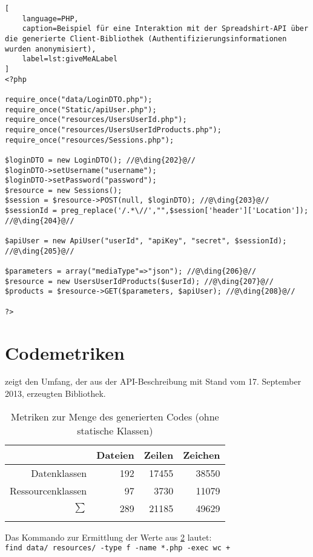 \begin{minipage}{\textwidth}
\begin{lstlisting}[
    language=PHP,
    caption=Beispiel für eine Interaktion mit der Spreadshirt-API über die generierte Client-Bibliothek (Authentifizierungsinformationen wurden anonymisiert),
    label=lst:giveMeALabel
]
<?php

require_once("data/LoginDTO.php");
require_once("Static/apiUser.php");
require_once("resources/UsersUserId.php");
require_once("resources/UsersUserIdProducts.php");
require_once("resources/Sessions.php");

$loginDTO = new LoginDTO(); //@\ding{202}@//
$loginDTO->setUsername("username");
$loginDTO->setPassword("password");
$resource = new Sessions();
$session = $resource->POST(null, $loginDTO); //@\ding{203}@//
$sessionId = preg_replace('/.*\//',"",$session['header']['Location']); //@\ding{204}@//

$apiUser = new ApiUser("userId", "apiKey", "secret", $sessionId); //@\ding{205}@//

$parameters = array("mediaType"=>"json"); //@\ding{206}@//
$resource = new UsersUserIdProducts($userId); //@\ding{207}@//
$products = $resource->GET($parameters, $apiUser); //@\ding{208}@//

?>
\end{lstlisting}
\end{minipage}

\section{Codemetriken}
\label{sec:codemetrics}

 zeigt den Umfang, der aus der \gls{API}-Beschreibung mit Stand vom 17. September 2013, erzeugten Bibliothek.

\begin{table}
    \begin{longtable}{r r r r}
        \toprule
        \rowcolor{lightgray}
                          & \textbf{Dateien}  & \textbf{Zeilen}     & \textbf{Zeichen}\\
        \midrule
        Datenklassen      & 192               & 17455               & 38550\\
        Ressourcenklassen & 97                & 3730                & 11079\\        
        \midrule
        $\sum$            & 289               & 21185               & 49629\\
        \bottomrule
        \caption{Metriken zur Menge des generierten Codes (ohne statische Klassen)}
        \label{tab:code_metrics}
    \end{longtable} 
\end{table}

Das Kommando zur Ermittlung der Werte aus \cref{tab:code_metrics} lautet:\\
\texttt{find data/ resources/ -type f -name *.php -exec wc {} +}
